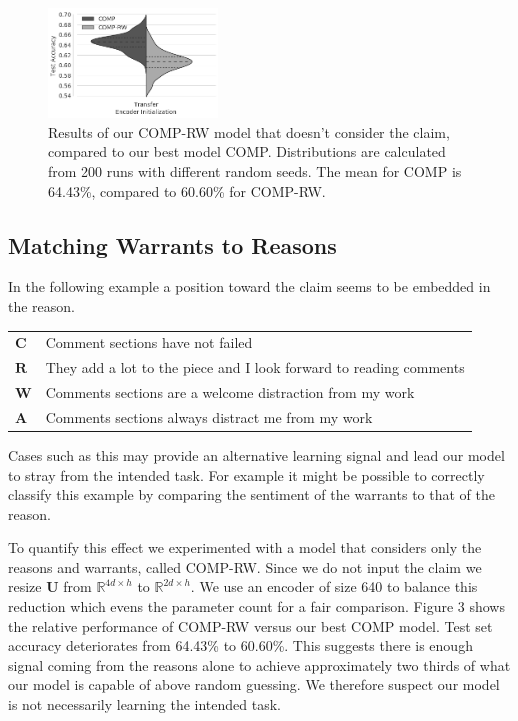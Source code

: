 \documentclass[11pt,a4paper]{article}
\begin{document}
\begin{figure}[t]
\centering
\includegraphics[width=0.4\textwidth]{rw.png}
\caption{Results of our COMP-RW model that doesn't consider the claim,
  compared to our best model COMP.
Distributions are calculated from 200 runs with different random seeds.
The mean for COMP is 64.43\%, compared to 60.60\% for COMP-RW.
}
\end{figure}

\subsection{Matching Warrants to Reasons}

In the following example a position toward the claim seems to be embedded in the reason.

\vspace{8pt}

\begin{tabular}{p{}p{}}
  $\mathbf{C}$ & Comment sections have not failed \\
  $\mathbf{R}$ & They add a lot to the piece and I look forward to reading comments \\
  $\mathbf{W}$ & Comments sections are a welcome distraction from my work \\
  $\mathbf{A}$ & Comments sections always distract me from my work \\
\end{tabular}

\vspace{8pt}

\noindent
Cases such as this may provide an alternative learning signal and lead our model to stray from the intended task.
For example it might be possible to correctly classify this example
  by comparing the sentiment of the warrants to that of the reason.

To quantify this effect we experimented with a model 
  that considers only the reasons and warrants, called COMP-RW.
Since we do not input the claim we resize $\mathbf{U}$ 
  from $\mathbb{R}^{4d \times h}$ to $\mathbb{R}^{2d \times h}$.
We use an encoder of size 640 to balance this reduction
  which evens the parameter count for a fair comparison.
Figure 3 shows the relative performance of COMP-RW versus our best COMP model.
Test set accuracy deteriorates from 64.43\% to 60.60\%.
This suggests there is enough signal coming from the reasons alone
  to achieve approximately two thirds of what our model is capable of above random guessing.
We therefore suspect our model is not necessarily learning the intended task.
\end{document}
